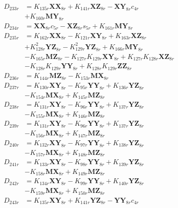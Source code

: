 \begin{align}
D_{233r} &= K_{135r}\mathbf{XX}_{8r} + K_{141r}\mathbf{XZ}_{8r} - \mathbf{XY}_{8r}c_{4r}  \nonumber \\
&+ K_{160r}\mathbf{MY}_{8r} \nonumber \\
D_{234r} &= \mathbf{XX}_{8r}c_{5r} - \mathbf{XZ}_{8r}s_{5r} + K_{161r}\mathbf{MY}_{8r} \nonumber \\
D_{235r} &= K_{162r}\mathbf{XX}_{8r} - K_{121r}\mathbf{XY}_{8r} + K_{163r}\mathbf{XZ}_{8r}  \nonumber \\
&+ K_{128r}^2\mathbf{YZ}_{8r} - K_{129r}^2\mathbf{YZ}_{8r} + K_{166r}\mathbf{MY}_{8r}  \nonumber \\
&- K_{165r}\mathbf{MZ}_{8r} - K_{127r}K_{129r}\mathbf{XY}_{8r} + K_{127r}K_{128r}\mathbf{XZ}_{8r}  \nonumber \\
&- K_{128r}K_{129r}\mathbf{YY}_{8r} + K_{128r}K_{129r}\mathbf{ZZ}_{8r} \nonumber \\
D_{236r} &= K_{144r}\mathbf{MZ}_{8r} - K_{153r}\mathbf{MX}_{8r} \nonumber \\
D_{237r} &= K_{130r}\mathbf{XY}_{8r} - K_{95r}\mathbf{YY}_{8r} + K_{136r}\mathbf{YZ}_{8r}  \nonumber \\
&- K_{154r}\mathbf{MX}_{8r} + K_{145r}\mathbf{MZ}_{8r} \nonumber \\
D_{238r} &= K_{131r}\mathbf{XY}_{8r} - K_{96r}\mathbf{YY}_{8r} + K_{137r}\mathbf{YZ}_{8r}  \nonumber \\
&- K_{155r}\mathbf{MX}_{8r} + K_{146r}\mathbf{MZ}_{8r} \nonumber \\
D_{239r} &= K_{131r}\mathbf{XY}_{8r} - K_{96r}\mathbf{YY}_{8r} + K_{137r}\mathbf{YZ}_{8r}  \nonumber \\
&- K_{156r}\mathbf{MX}_{8r} + K_{147r}\mathbf{MZ}_{8r} \nonumber \\
D_{240r} &= K_{132r}\mathbf{XY}_{8r} - K_{97r}\mathbf{YY}_{8r} + K_{138r}\mathbf{YZ}_{8r}  \nonumber \\
&- K_{157r}\mathbf{MX}_{8r} + K_{148r}\mathbf{MZ}_{8r} \nonumber \\
D_{241r} &= K_{133r}\mathbf{XY}_{8r} - K_{98r}\mathbf{YY}_{8r} + K_{139r}\mathbf{YZ}_{8r}  \nonumber \\
&- K_{158r}\mathbf{MX}_{8r} + K_{149r}\mathbf{MZ}_{8r} \nonumber \\
D_{242r} &= K_{134r}\mathbf{XY}_{8r} - K_{99r}\mathbf{YY}_{8r} + K_{140r}\mathbf{YZ}_{8r}  \nonumber \\
&- K_{159r}\mathbf{MX}_{8r} + K_{150r}\mathbf{MZ}_{8r} \nonumber \\
D_{243r} &= K_{135r}\mathbf{XY}_{8r} + K_{141r}\mathbf{YZ}_{8r} - \mathbf{YY}_{8r}c_{4r}  \nonumber \\

\end{align}
